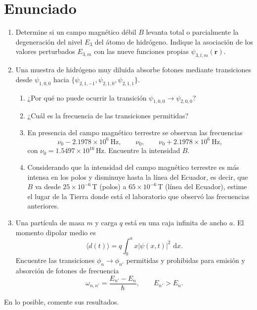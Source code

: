\documentclass[11pt,a4paper]{article}
\numberwithin{equation}{section}
\newcommand{\dd}{\,\mathrm d}
\begin{document}
\section*{Enunciado}
\begin{enumerate}[label=\arabic*.-]
\item Determine si un campo magnético débil $B$ levanta total o parcialmente la degeneración del nivel $E_3$ del átomo de hidrógeno. Indique la asociación de los valores perturbados $E_{3,m}$ con las nueve funciones propias $\psi_{3,l,m}(\mathbf r)$.
\item Una muestra de hidrógeno muy diluida absorbe fotones mediante transiciones desde $\psi_{1,0,0}$ hacia $\{\psi_{2,1,-1},\psi_{2,1,0},\psi_{2,1,1}\}$.
\begin{enumerate}[label=\alph*)]
\item ¿Por qué no puede ocurrir la transición $\psi_{1,0,0}\to\psi_{2,0,0}$?
\item ¿Cuál es la frecuencia de las transiciones permitidas?
\item En presencia del campo magnético terrestre se observan las frecuencias
\begin{equation}
\nu_0-2.1978\times10^6\ \text{Hz},\qquad \nu_0,\qquad
\nu_0+2.1978\times10^6\ \text{Hz},
\end{equation}
con $\nu_0=1.5497\times10^{16}\,$Hz. Encuentre la intensidad $B$.
\item Considerando que la intensidad del campo magnético terrestre es más intensa en los polos y disminuye hasta la línea del Ecuador, es decir, que $B$ va desde $25\times10^{-6}\,$T (polos) a $65\times10^{-6}\,$T (línea del Ecuador), estime el lugar de la Tierra donde está el laboratorio que observó las frecuencias anteriores.
\end{enumerate}
\item Una partícula de masa $m$ y carga $q$ está en una caja infinita de ancho $a$. El momento dipolar medio es
\begin{equation}
\langle d(t)\rangle=q\int_0^a x|\psi(x,t)|^2\,\dd x.
\end{equation}
Encuentre las transiciones $\phi_n\to\phi_{n'}$ permitidas y prohibidas para emisión y absorción de fotones de frecuencia
\begin{equation}
\omega_{n,n'}=\frac{E_{n'}-E_n}{\hbar},\qquad E_{n'}>E_n.
\end{equation}
\end{enumerate}
En lo posible, comente sus resultados.
\end{document}
